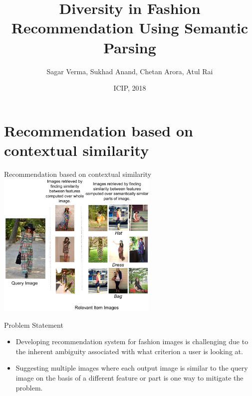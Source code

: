 \documentclass[handout]{beamer}
\title[EVA, Ann Arbor, MI 2015 \insertdate]{Diversity in Fashion Recommendation Using Semantic Parsing}
\author{Sagar Verma\inst{1}, Sukhad Anand\inst{1}, Chetan Arora\inst{1}, Atul Rai\inst{2}}
\institute[IIIT Delhi and Staqu Technologies] %
{
  \inst{1}%
  Department of Computer Science and Engineering\\
  Indraprastha Institute of Information Technology, Delhi.
  \and
  \inst{2}%
  Staqu Technologies}
\date{ICIP, 2018}
\begin{document}
\begin{frame}
\titlepage
\end{frame}

\section{Recommendation based on contextual similarity}

\begin{frame}
\begin{center}
{\Large Recommendation based on contextual similarity}\\
\vspace{.5cm}
\includegraphics[width=0.8\linewidth, height=7cm]{images/teaser_staqu_texture}
\end{center}
\end{frame}

\begin{frame}{Problem Statement}
\begin{itemize}
\item Developing recommendation system for fashion images is
challenging due to the inherent ambiguity associated with
what criterion a user is looking at.
\item Suggesting multiple
images where each output image is similar to the query image
on the basis of a different feature or part is one way
to mitigate the problem.
\end{itemize}
\end{frame}
\end{document}
